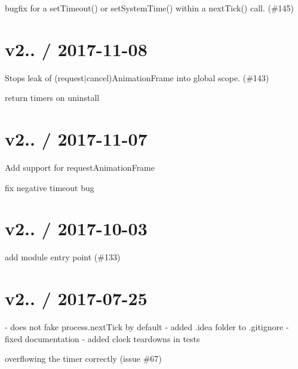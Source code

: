 \begin{DoxyItemize}
\item bugfix for a set\+Timeout() or set\+System\+Time() within a next\+Tick() call. (\#145)
\end{DoxyItemize}

\section*{v2.. / 2017-\/11-\/08 }


\begin{DoxyItemize}
\item Stops leak of (request$\vert$cancel)Animation\+Frame into global scope. (\#143)
\item return timers on uninstall
\end{DoxyItemize}

\section*{v2.. / 2017-\/11-\/07 }


\begin{DoxyItemize}
\item Add support for request\+Animation\+Frame
\item fix negative timeout bug
\end{DoxyItemize}

\section*{v2.. / 2017-\/10-\/03 }


\begin{DoxyItemize}
\item add module entry point (\#133)
\end{DoxyItemize}

\section*{v2.. / 2017-\/07-\/25 }


\begin{DoxyItemize}
\item -\/ does not fake process.\+next\+Tick by default -\/ added .idea folder to .gitignore -\/ fixed documentation -\/ added clock teardowns in tests
\item overflowing the timer correctly (issue \#67)
\end{DoxyItemize}

